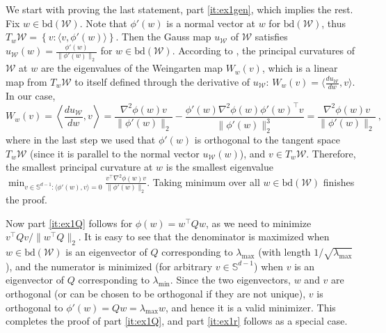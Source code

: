 \documentclass[english]{article}
\newcommand{\cW}{\mathcal{W}}
\newcommand{\seto}[1]{\left\{#1\right\}}
\newcommand{\bS}{\mathbb{S}}
\newcommand{\inpro}[2]{\langle #1, #2\rangle}
\newcommand{\inprol}[2]{\left\langle #1, #2\right\rangle}
\newcommand{\bd}{\mathrm{bd}}
\newenvironment{proofof}[1]{\par\noindent{\bf Proof of #1\ }}{\hfill\BlackBox\\[2mm]}
\begin{document}
\begin{proofof}{\cref{ex:curvature}}
We start with proving the last statement, part \eqref{it:ex1gen}, which implies the rest.
Fix $w\in\bd(\cW)$. Note that $\phi'(w)$ is a normal vector at $w$ for $\bd(\cW)$, thus $T_w\cW = \seto{v: \inpro{v}{\phi'(w)}}$.
Then the Gauss map $u_{\cW}$ of $\cW$ satisfies $u_{\cW}(w) = \frac{\phi'(w)}{\|\phi'(w)\|_2}$ for $w\in\bd(\cW)$.
According to \citet[page 105]{Sch14:ConvexBodies}, the principal curvatures of $\cW$ at $w$ are the eigenvalues of the Weingarten map $W_w(v)$, which is a linear map from $T_w\cW$ to itself defined through the derivative of $u_{\cW}$: $W_w(v)=\inpro{\frac{d u_{\cW}}{d w}}{v}$. In our case,
\[
W_w(v) = \inprol{\frac{d u_{\cW}}{d w}}{v}=  \frac{\nabla^2\phi(w)v}{\|\phi'(w)\|_2} -\frac{\phi'(w)\nabla^2\phi(w)\phi'(w)^{\top}v}{\|\phi'(w)\|_2^3} = \frac{\nabla^2\phi(w)v}{\|\phi'(w)\|_2}~,
\]
where in the last step we used that $\phi'(w)$ is orthogonal to the tangent space $T_w \cW$ (since it is parallel to the normal vector $u_\cW(w)$), and $v \in T_w \cW$.
Therefore, the smallest principal curvature at $w$ is the smallest eigenvalue $\min_{v \in \bS^{d-1}: \inpro{\phi'(w)}{v}=0} \frac{v^{\top}\nabla^2\phi(w) v}{\|\phi'(w)\|_2}$. Taking minimum over all  $w\in\bd(\cW)$ finishes the proof. 

Now part \eqref{it:ex1Q} follows for $\phi(w)=w^\top Q w$, as we need to minimize $v^\top Q v/\| w^\top Q\|_2$. It is easy to see that the denominator is maximized when $w \in \bd(\cW)$ is an eigenvector of $Q$ corresponding to $\lambda_{\max}$ (with length $1/\sqrt{\lambda_{\max}}$), and the numerator is minimized (for arbitrary $v \in \bS^{d-1}$) when $v$ is an eigenvector of $Q$ corresponding to $\lambda_{\min}$. Since the two eigenvectors, $w$ and $v$ are orthogonal (or can be chosen to be orthogonal if they are not unique), $v$ is orthogonal to $\phi'(w)= Q w = \lambda_{\max} w$, and hence it is a valid minimizer. This completes the proof of part \eqref{it:ex1Q}, and part \eqref{it:ex1r} follows as a special case.


\end{proofof}
\end{document}
